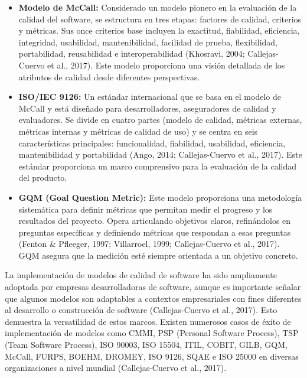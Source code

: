 \documentclass[11pt]{article}
\begin{document}
\begin{itemize}
    \item \textbf{Modelo de McCall:} Considerado un modelo pionero en la evaluación de la calidad del software, se estructura en tres etapas: factores de calidad, criterios y métricas. Sus once criterios base incluyen la exactitud, fiabilidad, eficiencia, integridad, usabilidad, mantenibilidad, facilidad de prueba, flexibilidad, portabilidad, reusabilidad e interoperabilidad (Khosravi, 2004; Callejas-Cuervo et al., 2017). Este modelo proporciona una visión detallada de los atributos de calidad desde diferentes perspectivas.
    \item \textbf{ISO/IEC 9126:} Un estándar internacional que se basa en el modelo de McCall y está diseñado para desarrolladores, aseguradores de calidad y evaluadores. Se divide en cuatro partes (modelo de calidad, métricas externas, métricas internas y métricas de calidad de uso) y se centra en seis características principales: funcionalidad, fiabilidad, usabilidad, eficiencia, mantenibilidad y portabilidad (Ango, 2014; Callejas-Cuervo et al., 2017). Este estándar proporciona un marco comprensivo para la evaluación de la calidad del producto.
    \item \textbf{GQM (Goal Question Metric):} Este modelo proporciona una metodología sistemática para definir métricas que permitan medir el progreso y los resultados del proyecto. Opera articulando objetivos claros, refinándolos en preguntas específicas y definiendo métricas que respondan a esas preguntas (Fenton \& Pfleeger, 1997; Villarroel, 1999; Callejas-Cuervo et al., 2017). GQM asegura que la medición esté siempre orientada a un objetivo concreto.
\end{itemize}

La implementación de modelos de calidad de software ha sido ampliamente adoptada por empresas desarrolladoras de software, aunque es importante señalar que algunos modelos son adaptables a contextos empresariales con fines diferentes al desarrollo o construcción de software (Callejas-Cuervo et al., 2017). Esto demuestra la versatilidad de estos marcos. Existen numerosos casos de éxito de implementación de modelos como CMMI, PSP (Personal Software Process), TSP (Team Software Process), ISO 90003, ISO 15504, ITIL, COBIT, GILB, GQM, McCall, FURPS, BOEHM, DROMEY, ISO 9126, SQAE e ISO 25000 en diversas organizaciones a nivel mundial (Callejas-Cuervo et al., 2017).
\end{document}
